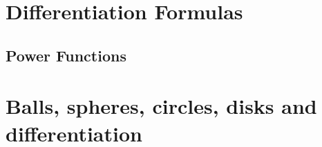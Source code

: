 \documentclass%
[handout]
{beamer}
\begin{document}
{\section{Differentiation Formulas}

\subsection{Power Functions}



\section{Balls, spheres, circles, disks and differentiation}

}%
\end{document}
